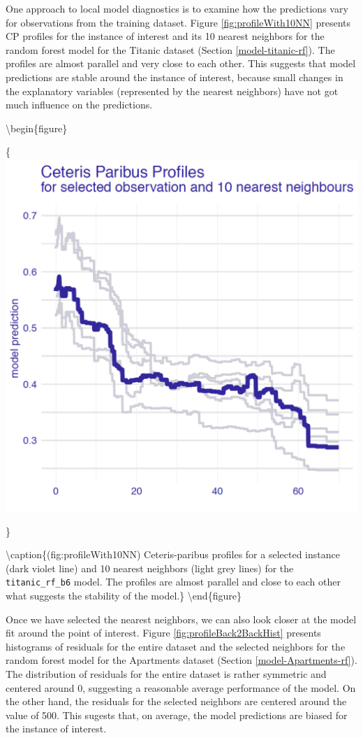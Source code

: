 \documentclass[12pt,]{krantz}
\theoremstyle{definition}
\theoremstyle{definition}
\theoremstyle{definition}
\theoremstyle{remark}
\begin{document}
One approach to local model diagnostics is to examine how the
predictions vary for observations from the training dataset. Figure
\ref{fig:profileWith10NN} presents CP profiles for the instance of
interest and its 10 nearest neighbors for the random forest model for
the Titanic dataset (Section \ref{model-titanic-rf}). The profiles are
almost parallel and very close to each other. This suggests that model
predictions are stable around the instance of interest, because small
changes in the explanatory variables (represented by the nearest
neighbors) have not got much influence on the predictions.

\textbackslash{}begin\{figure\}

\{\centering \includegraphics[width=0.5\linewidth]{figure/example_cp}

\}

\textbackslash{}caption\{(fig:profileWith10NN) Ceteris-paribus profiles
for a selected instance (dark violet line) and 10 nearest neighbors
(light grey lines) for the \texttt{titanic\_rf\_b6} model. The profiles
are almost parallel and close to each other what suggests the stability
of the model.\}\label{fig:profileWith10NN} \textbackslash{}end\{figure\}

Once we have selected the nearest neighbors, we can also look closer at
the model fit around the point of interest. Figure
\ref{fig:profileBack2BackHist} presents histograms of residuals for the
entire dataset and the selected neighbors for the random forest model
for the Apartments dataset (Section \ref{model-Apartments-rf}). The
distribution of residuals for the entire dataset is rather symmetric and
centered around 0, suggesting a reasonable average performance of the
model. On the other hand, the residuals for the selected neighbors are
centered around the value of 500. This sugests that, on average, the
model predictions are biased for the instance of interest.
\end{document}
